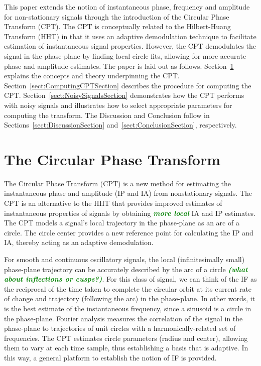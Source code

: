 \documentclass[journal,11pt,a4paper,onecolumn,draftcls]{IEEEtran}
\newcommand{\dean}[1]{\textsf{\emph{\textbf{\textcolor{green}{#1}}}}}
\begin{document}
This paper extends the notion of instantaneous phase, frequency and amplitude for non-stationary signals through the introduction of the Circular Phase Transform (CPT). The CPT is conceptually related to the Hilbert-Huang Transform (HHT) in that it uses an adaptive demodulation technique to facilitate estimation of instantaneous signal properties. However, the CPT demodulates the signal in the phase-plane by finding local circle fits, allowing for more accurate phase and amplitude estimates. The paper is laid out as follows. Section~\ref{sect:CPTDescriptionSection} explains the concepts and theory underpinning the CPT. Section~\ref{sect:ComputingCPTSection} describes the procedure for computing the CPT. Section~\ref{sect:NoisySignalsSection} demonstrates how the CPT performs with noisy signals and illustrates how to select appropriate parameters for computing the transform. %
The Discussion and Conclusion follow in Sections~\ref{sect:DiscussionSection} and~\ref{sect:ConclusionSection}, respectively. 

\section{The Circular Phase Transform}\label{sect:CPTDescriptionSection}
The Circular Phase Transform (CPT) is a new method for estimating the instantaneous phase and amplitude (IP and IA) from nonstationary signals. The CPT is an alternative to the HHT that provides improved estimates of instantaneous properties of signals by obtaining \dean{more local} IA and IP estimates. The CPT models a signal's local trajectory in the phase-plane as an arc of a circle. The circle center provides a new reference point for calculating the IP and IA, thereby acting as an adaptive demodulation.

For smooth and continuous oscillatory signals, the local (infinitesimally small) phase-plane trajectory can be accurately described by the arc of a circle \dean{(what about inflections or cusps?)}. For this class of signal, we can think of the IF as the reciprocal of the time taken to complete the circular orbit at its current rate of change and trajectory (following the arc) in the phase-plane. In other words, it is the best estimate of the instantaneous frequency, since a sinusoid is a circle in the phase-plane. Fourier analysis measures the correlation of the signal in the phase-plane to trajectories of unit circles with a harmonically-related set of frequencies. The CPT estimates circle parameters (radius and center), allowing them to vary at each time sample, thus establishing a basis that is adaptive. In this way, a general platform to establish the notion of IF is provided.
\end{document}
